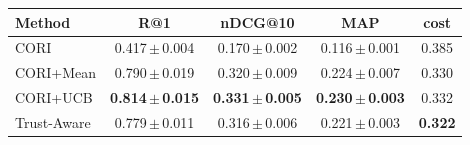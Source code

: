 \begin{tabular}{l cccc}
\toprule
Method & R@1 & nDCG@10 & MAP & cost \\
\midrule
CORI & 0.417\,$\pm$\,0.004 & 0.170\,$\pm$\,0.002 & 0.116\,$\pm$\,0.001 & 0.385 \\
CORI+Mean & 0.790\,$\pm$\,0.019 & 0.320\,$\pm$\,0.009 & 0.224\,$\pm$\,0.007 & 0.330 \\
CORI+UCB & \textbf{0.814\,$\pm$\,0.015} & \textbf{0.331\,$\pm$\,0.005} & \textbf{0.230\,$\pm$\,0.003} & 0.332 \\
Trust-Aware & 0.779\,$\pm$\,0.011 & 0.316\,$\pm$\,0.006 & 0.221\,$\pm$\,0.003 & \textbf{0.322} \\
\bottomrule
\end{tabular}

